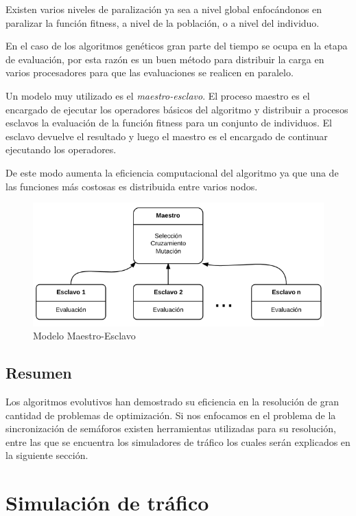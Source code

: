 Existen varios niveles de paralización ya sea a nivel global enfocándonos en paralizar la función fitness, a nivel de la población, o a nivel del individuo. \citep{Nesmachnow2002}

En el caso de los algoritmos genéticos gran parte del tiempo se ocupa en la etapa de evaluación, por esta razón es un buen método para distribuir la carga en varios procesadores para que las evaluaciones se realicen en paralelo. 

Un modelo muy utilizado es el \emph{maestro-esclavo}. El proceso maestro es el encargado de ejecutar los operadores básicos del algoritmo y distribuir a procesos esclavos la evaluación de la función fitness para un conjunto de individuos. El esclavo devuelve el resultado y luego el maestro es el encargado de continuar ejecutando los operadores.

De este modo aumenta la eficiencia computacional del algoritmo ya que una de las funciones más costosas es distribuida entre varios nodos.

\begin{figure}[H]
	\centering
	\includegraphics[width=0.7\linewidth]{Figures/diagrama-master-slave}
	\caption[Modelo Maestro-Esclavo]{Modelo Maestro-Esclavo}
	\label{fig:diagrama-master-slave}
\end{figure}

\subsection{Resumen}
Los algoritmos evolutivos han demostrado su eficiencia en la resolución de gran cantidad de problemas de optimización.  Si nos enfocamos en el problema de la sincronización de semáforos existen herramientas utilizadas para su resolución, entre las que se encuentra los simuladores de tráfico los cuales serán explicados en la siguiente sección.


\section{Simulación de tráfico}

